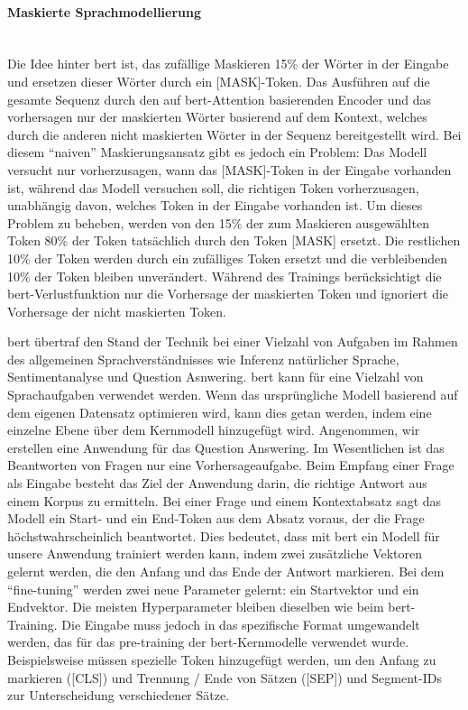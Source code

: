 \documentclass[
        ngerman,
        paper=a4,
        numbers=noendperiod,
]{scrreprt}
\begin{document}
\paragraph{Maskierte Sprachmodellierung}$\;$\\
Die Idee hinter \ac{bert} ist, das zufällige Maskieren 15\% der Wörter in der Eingabe und ersetzen dieser Wörter durch ein [MASK]-Token. Das Ausführen auf die gesamte Sequenz durch den auf \ac{bert}-Attention basierenden Encoder und das vorhersagen nur der maskierten Wörter basierend auf dem Kontext, welches durch die anderen nicht maskierten Wörter in der Sequenz bereitgestellt wird. Bei diesem \enquote{naiven} Maskierungsansatz gibt es jedoch ein Problem: Das Modell versucht nur vorherzusagen, wann das [MASK]-Token in der Eingabe vorhanden ist, während das Modell versuchen soll, die richtigen Token vorherzusagen, unabhängig davon, welches Token in der Eingabe vorhanden ist. Um dieses Problem zu beheben, werden von den 15\% der zum Maskieren ausgewählten Token 80\% der Token tatsächlich durch den Token [MASK] ersetzt. Die restlichen 10\% der Token werden durch ein zufälliges Token ersetzt und die verbleibenden 10\% der Token bleiben unverändert. Während des Trainings berücksichtigt die \ac{bert}-Verlustfunktion nur die Vorhersage der maskierten Token und ignoriert die Vorhersage der nicht maskierten Token. 

\ac{bert} übertraf den Stand der Technik bei einer Vielzahl von Aufgaben im Rahmen des allgemeinen Sprachverständnisses wie Inferenz natürlicher Sprache, Sentimentanalyse und Question Asnwering. \ac{bert} kann für eine Vielzahl von Sprachaufgaben verwendet werden. Wenn das ursprüngliche Modell basierend auf dem eigenen Datensatz optimieren wird, kann dies getan werden, indem eine einzelne Ebene über dem Kernmodell hinzugefügt wird. Angenommen, wir erstellen eine Anwendung für das Question Answering. Im Wesentlichen ist das Beantworten von Fragen nur eine Vorhersageaufgabe. Beim Empfang einer Frage als Eingabe besteht das Ziel der Anwendung darin, die richtige Antwort aus einem Korpus zu ermitteln. Bei einer Frage und einem Kontextabsatz sagt das Modell ein Start- und ein End-Token aus dem Absatz voraus, der die Frage höchstwahrscheinlich beantwortet. Dies bedeutet, dass mit \ac{bert} ein Modell für unsere Anwendung trainiert werden kann, indem zwei zusätzliche Vektoren gelernt werden, die den Anfang und das Ende der Antwort markieren. Bei dem \enquote{fine-tuning} werden zwei neue Parameter gelernt: ein Startvektor und ein Endvektor. Die meisten Hyperparameter bleiben dieselben wie beim \ac{bert}-Training. Die Eingabe muss jedoch in das spezifische Format umgewandelt werden, das für das pre-training der \ac{bert}-Kernmodelle verwendet wurde. Beispielsweise müssen spezielle Token hinzugefügt werden, um den Anfang zu markieren ([CLS]) und Trennung / Ende von Sätzen ([SEP]) und Segment-IDs zur Unterscheidung verschiedener Sätze. 
\end{document}
